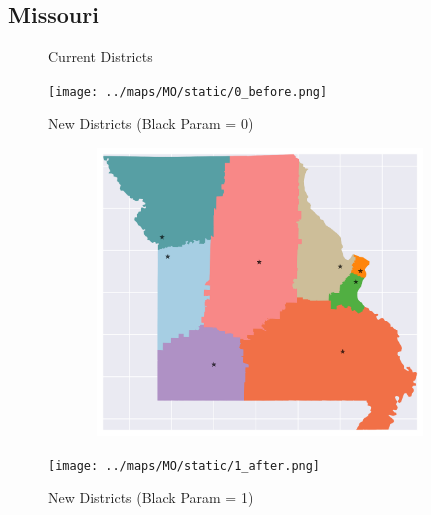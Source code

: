 \subsection{Missouri}
\begin{figure}[htb!] \centering
\caption{ Current Districts }
\texttt{[image: ../maps/MO/static/0\_before.png]}
\caption{ New Districts (Black Param = 0) }
\includegraphics[width=5in,height=3in,keepaspectratio]{../maps/MO/static/0_after.png}
\caption{ New Districts (Black Param = 1) }
\texttt{[image: ../maps/MO/static/1\_after.png]}
\end{figure}

\clearpage
\newpage

